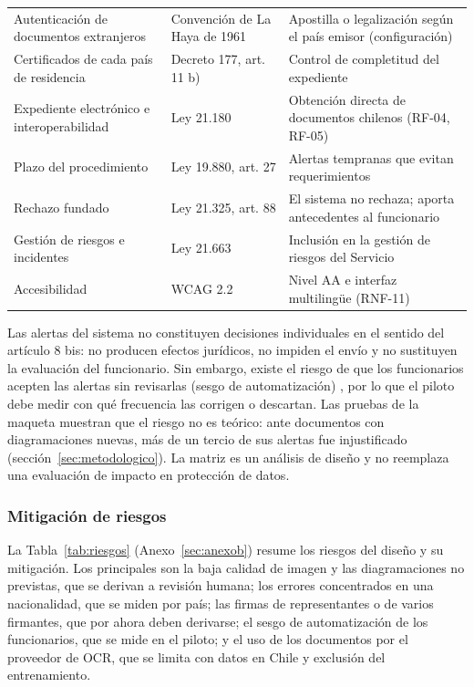 \documentclass[11pt,a4paper]{article}
\begin{document}
\begin{table}[!htbp]
\begin{tabularx}{\textwidth}{>{\raggedright\arraybackslash}p{4.2cm} >{\raggedright\arraybackslash}p{3.6cm} L}
Autenticación de documentos extranjeros & Convención de La Haya de 1961 \cite{hcch2026} & Apostilla o legalización según el país emisor (configuración) \\
Certificados de cada país de residencia & Decreto 177, art. 11 b) \cite{decreto177} & Control de completitud del expediente \\
Expediente electrónico e interoperabilidad & Ley 21.180 & Obtención directa de documentos chilenos (RF-04, RF-05) \\
Plazo del procedimiento & Ley 19.880, art. 27 & Alertas tempranas que evitan requerimientos \\
Rechazo fundado & Ley 21.325, art. 88 & El sistema no rechaza; aporta antecedentes al funcionario \\
Gestión de riesgos e incidentes & Ley 21.663 & Inclusión en la gestión de riesgos del Servicio \\
Accesibilidad & WCAG 2.2 & Nivel AA e interfaz multilingüe (RNF-11) \\
\bottomrule
\end{tabularx}
\end{table}

Las alertas del sistema no constituyen decisiones individuales en el sentido del artículo 8 bis: no producen efectos jurídicos, no impiden el envío y no sustituyen la evaluación del funcionario. Sin embargo, existe el riesgo de que los funcionarios acepten las alertas sin revisarlas (sesgo de automatización) \cite{parasuraman2010}, por lo que el piloto debe medir con qué frecuencia las corrigen o descartan. Las pruebas de la maqueta muestran que el riesgo no es teórico: ante documentos con diagramaciones nuevas, más de un tercio de sus alertas fue injustificado (sección~\ref{sec:metodologico}). La matriz es un análisis de diseño y no reemplaza una evaluación de impacto en protección de datos.

\subsubsection{Mitigación de riesgos}
\label{sec:riesgos}
La Tabla~\ref{tab:riesgos} (Anexo~\ref{sec:anexob}) resume los riesgos del diseño y su mitigación. Los principales son la baja calidad de imagen y las diagramaciones no previstas, que se derivan a revisión humana; los errores concentrados en una nacionalidad, que se miden por país; las firmas de representantes o de varios firmantes, que por ahora deben derivarse; el sesgo de automatización de los funcionarios, que se mide en el piloto; y el uso de los documentos por el proveedor de OCR, que se limita con datos en Chile y exclusión del entrenamiento.
\end{document}
